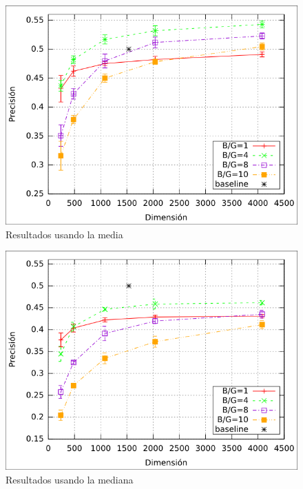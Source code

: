 			\begin{figure}[htbp!]
				\centering
				\centerline{
					\includegraphics[scale=0.6]{img/resultados/reales/mean.png}
				}
				\caption[Resultados media]{Resultados usando la media}
				\label{fig: Reales-media}
			\end{figure}
			\begin{figure}[htbp!]
				\centering
				\centerline{
					\includegraphics[scale=0.6]{img/resultados/reales/median.png}
				}
				\caption[Resultados mediana]{Resultados usando la mediana}
				\label{fig: Reales-mediana}
			\end{figure}
